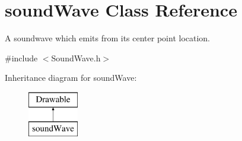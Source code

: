 \hypertarget{classsound_wave}{}\section{sound\+Wave Class Reference}
\label{classsound_wave}


A soundwave which emits from its center point location.  




{\ttfamily \#include $<$Sound\+Wave.\+h$>$}

Inheritance diagram for sound\+Wave\+:\begin{figure}[H]
\begin{center}
\leavevmode
\includegraphics[height=2.000000cm]{classsound_wave}
\end{center}
\end{figure}
